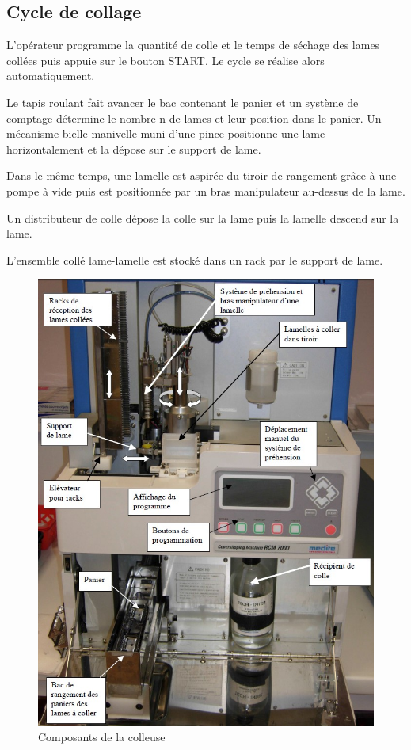 \newpage

\subsection{Cycle de collage}

L'opérateur programme la quantité de colle et le temps de séchage des lames collées puis appuie sur le bouton START. Le cycle se réalise alors automatiquement.

Le tapis roulant fait avancer le bac contenant le panier et un système de comptage détermine le nombre n de lames et leur position dans le panier. Un mécanisme bielle-manivelle muni d'une pince positionne une lame horizontalement et la dépose sur le support de lame.

Dans le même temps, une lamelle est aspirée du tiroir de rangement grâce à une pompe à vide puis est positionnée par un bras manipulateur au-dessus de la lame.

Un distributeur de colle dépose la colle sur la lame puis la lamelle descend sur la lame.

L'ensemble collé \og lame-lamelle \fg est stocké dans un rack par le support de lame.

\begin{figure}[htbp]
\begin{center}
\includegraphics[width=0.95\linewidth]{img/colleuse_exp.jpg}
\caption{Composants de la colleuse}
\label{fig:image103}
\end{center}
\end{figure}

